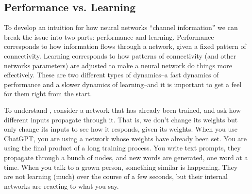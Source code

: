 \subsection{Performance vs. Learning}\label{performanceLearning}


To develop an intuition for how neural networks ``channel information'' we can break the issue into two parts: performance and learning. Performance corresponds to how information flows through a network, given a fixed pattern of connectivity.  Learning corresponds to how patterns of connectivity (and other networks parameters) are adjusted to make a neural network do things more effectively. These are two different types of dynamics--a fast dynamics of performance and a slower dynamics of learning--and it is important to get a feel for them right from the start.
 
To understand , consider a network that has already been trained, and ask how different inputs propagate through it. That is, we don't change its weights but only change its inputs to see how it responds, given its weights. When you use ChatGPT, you are using a network whose weights have already been set. You are using the final product of a long training process. You write text prompts, they propagate through a bunch of nodes, and new words are generated, one word at a time.  When you talk to a grown person, something similar is happening. They are not learning (much) over the course of a few seconds, but their internal networks are reacting to what you say.  

